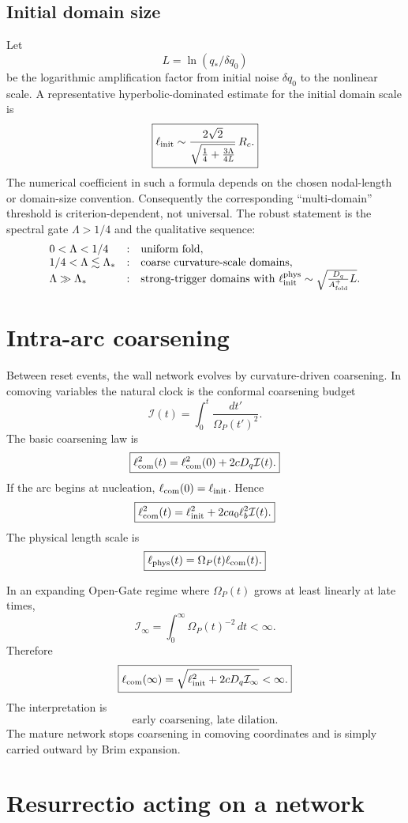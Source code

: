 \documentclass[11pt]{article}
\newcommand{\Op}{\Omega_P}
\newcommand{\Af}{A_{\rm fold}}
\newcommand{\Dq}{D_q}
\newcommand{\ellcom}{\ell_{\rm com}}
\newcommand{\ellphys}{\ell_{\rm phys}}
\newcommand{\ellinit}{\ell_{\rm init}}
\newcommand{\Lam}{\Lambda}
\newcommand{\Iconf}{\mathcal I}
\theoremstyle{definition}
\theoremstyle{plain}
\begin{document}
\subsection{Initial domain size}
Let
\[
L=\ln(q_\ast/\delta q_0)
\]
be the logarithmic amplification factor from initial noise $\delta q_0$ to the nonlinear scale.  A representative
hyperbolic-dominated estimate for the initial domain scale is
\[
\boxed{
\ellinit
\sim
\frac{2\sqrt2}{\sqrt{\frac14+\frac{3\Lam}{4L}}}\,R_c.
}
\]
The numerical coefficient in such a formula depends on the chosen nodal-length or domain-size convention.
Consequently the corresponding ``multi-domain'' threshold is criterion-dependent, not universal.  The robust
statement is the spectral gate $\Lam>1/4$ and the qualitative sequence:
\[
\begin{array}{lll}
0<\Lam<1/4 &:& \text{uniform fold},\\
1/4<\Lam\lesssim\Lam_\ast &:& \text{coarse curvature-scale domains},\\
\Lam\gg\Lam_\ast &:& \text{strong-trigger domains with }\ellinit^{\rm phys}\sim\sqrt{\frac{\Dq}{\Af^+}L}.
\end{array}
\]

\section{Intra-arc coarsening}

Between reset events, the wall network evolves by curvature-driven coarsening.  In comoving variables the
natural clock is the conformal coarsening budget
\[
\boxed{
\Iconf(t)=\int_{0}^{t}\frac{dt'}{\Op(t')^2}.
}
\]
The basic coarsening law is
\[
\boxed{
\ellcom^2(t)
=
\ellcom^2(0)+2c\Dq\Iconf(t).
}
\]
If the arc begins at nucleation, $\ellcom(0)=\ellinit$.  Hence
\[
\boxed{
\ellcom^2(t)
=
\ellinit^2+2c a_0\ell_b^2\Iconf(t).
}
\]
The physical length scale is
\[
\boxed{
\ellphys(t)=\Op(t)\ellcom(t).
}
\]

In an expanding Open-Gate regime where $\Op(t)$ grows at least linearly at late times,
\[
\Iconf_\infty=\int_0^\infty\Op(t)^{-2}\,dt<\infty.
\]
Therefore
\[
\boxed{
\ellcom(\infty)
=\sqrt{\ellinit^2+2c\Dq\Iconf_\infty}<\infty.
}
\]
The interpretation is
\[
\boxed{\text{early coarsening, late dilation.}}
\]
The mature network stops coarsening in comoving coordinates and is simply carried outward by Brim expansion.

\section{Resurrectio acting on a network}
\end{document}
